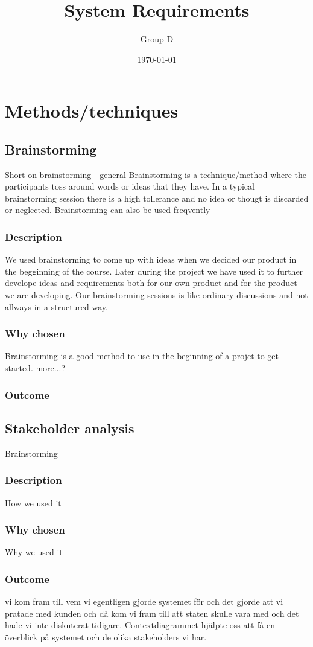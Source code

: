 \documentclass[a4paper]{article}
\title{System Requirements}
\author{Group D}
\date{\today}
\begin{document}
  \tableofcontents

  \section{Methods/techniques}
  \subsection{Brainstorming}
  Short on brainstorming - general
  Brainstorming is a technique/method where the participants toss around words or ideas that they have. In a typical brainstorming session there is a high tollerance and no idea or thougt is discarded or neglected. Brainstorming can also be used freqvently 
    \subsubsection{Description}
    We used brainstorming to come up with ideas when we decided our product in the begginning of the course. Later during the project we have used it to further develope ideas and requirements both for our own product and for the product we are developing. Our brainstorming sessions is like ordinary discussions and not allways in a structured way.
    \subsubsection{Why chosen}
    Brainstorming is a good method to use in the beginning of a projct to get started. more...? 
    \subsubsection{Outcome}
    
    \subsection{Stakeholder analysis}
    Brainstorming
    \subsubsection{Description}
    How we used it
    \subsubsection{Why chosen}
    Why we used it
    \subsubsection{Outcome}
    vi kom fram till vem vi egentligen gjorde systemet för och det gjorde att vi pratade med kunden och då kom vi fram till att staten skulle vara med och det hade vi inte diskuterat tidigare. 
Contextdiagrammet hjälpte oss att få en överblick på systemet och de olika stakeholders vi har.
    
\end{document}
